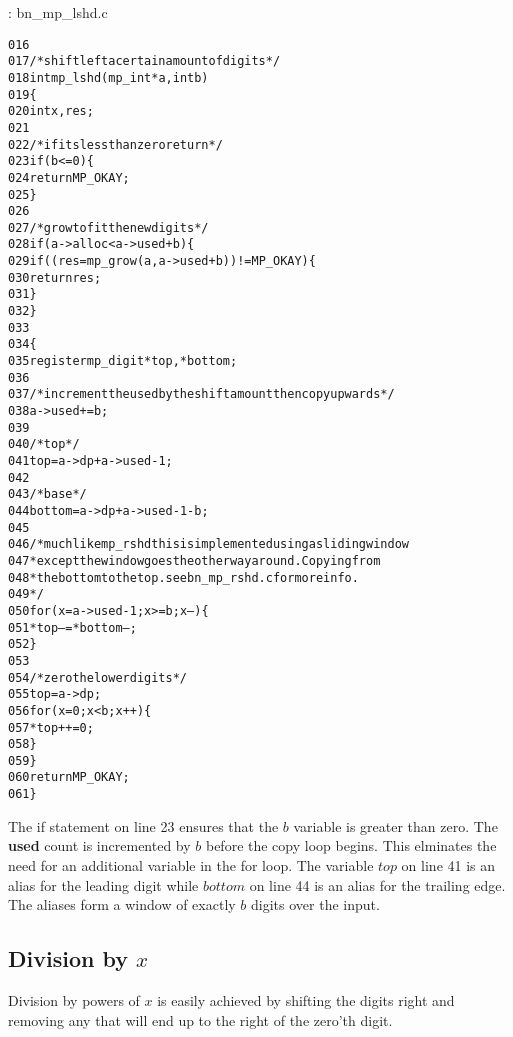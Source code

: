 \documentclass[b5paper]{book}
\begin{document}
\vspace{+3mm}\begin{small}
\hspace{-5.1mm}{\bf File}: bn\_mp\_lshd.c
\vspace{-3mm}
\begin{alltt}
016   
017   /* shift left a certain amount of digits */
018   int mp_lshd (mp_int * a, int b)
019   \{
020     int     x, res;
021   
022     /* if its less than zero return */
023     if (b <= 0) \{
024       return MP_OKAY;
025     \}
026   
027     /* grow to fit the new digits */
028     if (a->alloc < a->used + b) \{
029        if ((res = mp_grow (a, a->used + b)) != MP_OKAY) \{
030          return res;
031        \}
032     \}
033   
034     \{
035       register mp_digit *top, *bottom;
036   
037       /* increment the used by the shift amount then copy upwards */
038       a->used += b;
039   
040       /* top */
041       top = a->dp + a->used - 1;
042   
043       /* base */
044       bottom = a->dp + a->used - 1 - b;
045   
046       /* much like mp_rshd this is implemented using a sliding window
047        * except the window goes the otherway around.  Copying from
048        * the bottom to the top.  see bn_mp_rshd.c for more info.
049        */
050       for (x = a->used - 1; x >= b; x--) \{
051         *top-- = *bottom--;
052       \}
053   
054       /* zero the lower digits */
055       top = a->dp;
056       for (x = 0; x < b; x++) \{
057         *top++ = 0;
058       \}
059     \}
060     return MP_OKAY;
061   \}
\end{alltt}
\end{small}

The if statement on line 23 ensures that the $b$ variable is greater than zero.  The \textbf{used} count is incremented by $b$ before
the copy loop begins.  This elminates the need for an additional variable in the for loop.  The variable $top$ on line 41 is an alias
for the leading digit while $bottom$ on line 44 is an alias for the trailing edge.  The aliases form a window of exactly $b$ digits
over the input.  

\subsection{Division by $x$}

Division by powers of $x$ is easily achieved by shifting the digits right and removing any that will end up to the right of the zero'th digit.  
\end{document}
